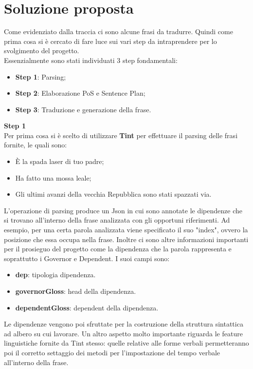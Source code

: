 
\chapter{Soluzione proposta}
Come evidenziato dalla traccia ci sono alcune frasi da tradurre. Quindi come prima cosa si è cercato di fare luce sui vari step da intraprendere per lo svolgimento del progetto.\\
Essenzialmente sono stati individuati 3 step fondamentali:
\begin{itemize}
	\item \textbf{Step 1}: Parsing;
	\item \textbf{Step 2}: Elaborazione PoS e Sentence Plan;
	\item \textbf{Step 3}: Traduzione e generazione della frase.
\end{itemize}
\textbf{Step 1}\\
Per prima cosa si è scelto di utilizzare \textbf{Tint} per effettuare il parsing delle frasi fornite, le quali sono:
\begin{itemize}
	\item È la spada laser di tuo padre;
	\item Ha fatto una mossa leale;
	\item Gli ultimi avanzi della vecchia Repubblica sono stati spazzati via.
\end{itemize}
L'operazione di parsing produce un Json in cui sono annotate le dipendenze che si trovano all'interno della frase analizzata con gli opportuni riferimenti. Ad esempio, per una certa parola analizzata viene specificato il suo "index", ovvero la posizione che essa occupa nella frase. Inoltre ci sono altre informazioni importanti per il prosieguo del progetto come la dipendenza che la parola rappresenta e soprattutto i Governor e Dependent. I suoi campi sono:
\begin{itemize}
	\item \textbf{dep}: tipologia dipendenza.
	\item \textbf{governorGloss}: head della dipendenza.
	\item \textbf{dependentGloss}: dependent della dipendenza.
\end{itemize}
Le dipendenze vengono poi sfruttate per la costruzione della struttura sintattica ad albero su cui lavorare. Un altro aspetto molto importante riguarda le feature linguistiche fornite da Tint stesso: quelle relative alle forme verbali permetteranno poi il corretto settaggio dei metodi per l'impostazione del tempo verbale all'interno della frase.\\
